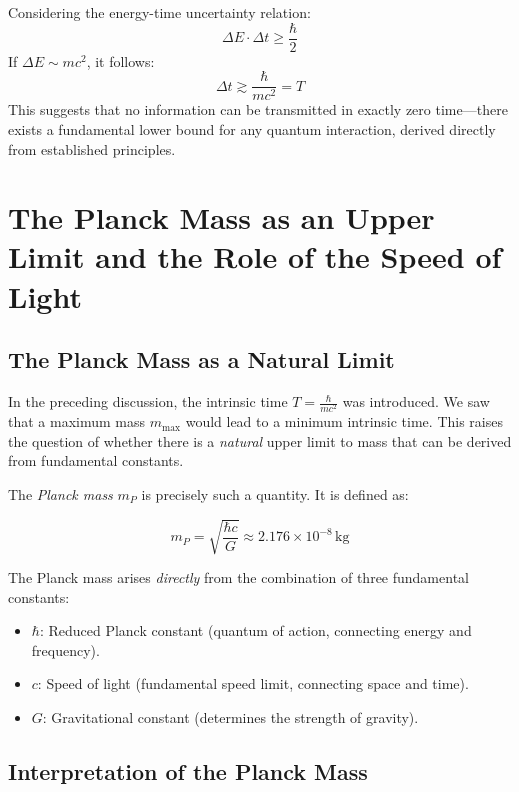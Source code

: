 \documentclass{article}
\begin{document}
	Considering the energy-time uncertainty relation:
	\begin{equation}
		\Delta E \cdot \Delta t \geq \frac{\hbar}{2}
	\end{equation}
	If $\Delta E \sim mc^2$, it follows:
	\begin{equation}
		\Delta t \gtrsim \frac{\hbar}{mc^2} = T
	\end{equation}
	This suggests that no information can be transmitted in exactly zero time—there exists a fundamental lower bound for any quantum interaction, derived directly from established principles.
	
	\section{The Planck Mass as an Upper Limit and the Role of the Speed of Light}
	
	\subsection{The Planck Mass as a Natural Limit}
	
	In the preceding discussion, the intrinsic time $T = \frac{\hbar}{mc^2}$ was introduced. We saw that a maximum mass $m_{\text{max}}$ would lead to a minimum intrinsic time. This raises the question of whether there is a \textit{natural} upper limit to mass that can be derived from fundamental constants.
	
	The \textit{Planck mass} $m_P$ is precisely such a quantity. It is defined as:
	
	\begin{equation}
		m_P = \sqrt{\frac{\hbar c}{G}} \approx 2.176 \times 10^{-8} \, \text{kg}
	\end{equation}
	
	The Planck mass arises \textit{directly} from the combination of three fundamental constants:
	
	\begin{itemize}
		\item $\hbar$: Reduced Planck constant (quantum of action, connecting energy and frequency).
		\item $c$: Speed of light (fundamental speed limit, connecting space and time).
		\item $G$: Gravitational constant (determines the strength of gravity).
	\end{itemize}
	
	\subsection{Interpretation of the Planck Mass}
	
\end{document}
